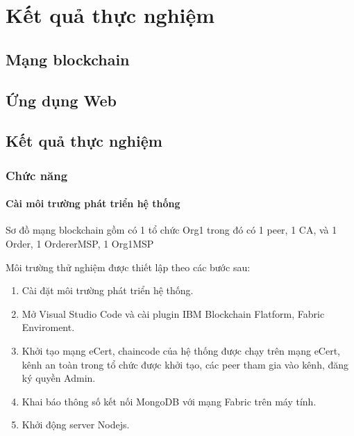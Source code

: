 \chapter{Kết quả thực nghiệm}
\section{Mạng blockchain}

\section{Ứng dụng Web}

\section{Kết quả thực nghiệm}

\subsection{Chức năng}


\subsubsection{Cài môi trường phát triển hệ thống}
Sơ đồ mạng blockchain gồm có 1 tổ chức Org1 trong đó có 1 peer, 1 CA, và 1 Order, 1 OrdererMSP, 1 Org1MSP
 
Môi trường thử nghiệm được thiết lập theo các bước sau:
\begin{enumerate}
\item Cài đặt môi trường phát triển hệ thống.
\item Mở Visual Studio Code và cài plugin IBM Blockchain Flatform, Fabric Enviroment.
\item Khởi tạo mạng eCert, chaincode của hệ thống được chạy trên mạng eCert, kênh an toàn trong tổ chức được khởi tạo, các peer tham gia vào kênh, đăng ký quyền Admin.
\item Khai báo thông số kết nối MongoDB với mạng Fabric trên máy tính.
\item Khởi động server Nodejs.
\end{enumerate}


